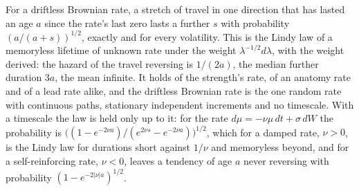 \begin{proposition}\label{imp:trend}
For a driftless Brownian rate, a stretch of travel in one direction that
has lasted an age $a$ since the rate's last zero lasts a further $s$ with
probability $(a/(a+s))^{1/2}$, exactly and for every volatility. This is
the Lindy law of a memoryless lifetime of unknown rate under the weight
$\lambda^{-1/2}d\lambda$, with the weight derived: the hazard of the
travel reversing is $1/(2a)$, the median further duration $3a$, the mean
infinite. It holds of the strength's rate, of an anatomy rate and of a
lead rate alike, and the driftless Brownian rate is the one random rate
with continuous paths, stationary independent increments and no
timescale. With a timescale the law is held only up to it: for the rate
$d\mu=-\nu\mu\,dt+\sigma\,dW$ the probability is
$\bigl((1-e^{-2\nu a})/(e^{2\nu s}-e^{-2\nu a})\bigr)^{1/2}$, which for a
damped rate, $\nu>0$, is the Lindy law for durations short against $1/\nu$
and memoryless beyond, and for a self-reinforcing rate, $\nu<0$, leaves a
tendency of age $a$ never reversing with probability
$(1-e^{-2|\nu|a})^{1/2}$.
\end{proposition}

